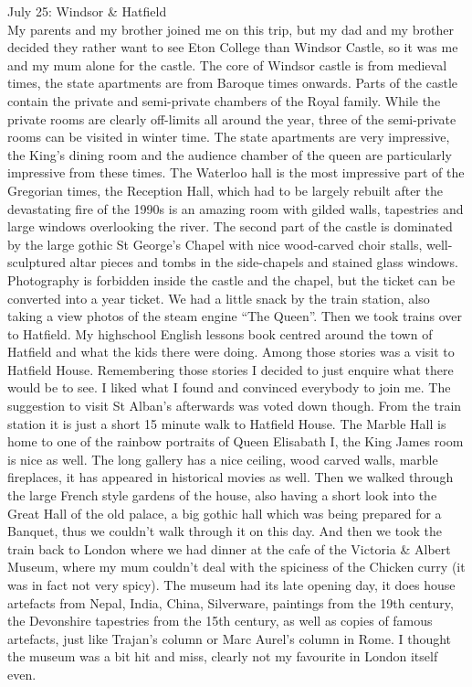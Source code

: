 July 25: Windsor \& Hatfield\\
My parents and my brother joined me on this trip, but my dad and my brother decided they rather want to see Eton College than Windsor Castle, so it was me and my mum alone for the castle. The core of Windsor castle is from medieval times, the state apartments are from Baroque times onwards. Parts of the castle contain the private and semi-private chambers of the Royal family. While the private rooms are clearly off-limits all around the year, three of the semi-private rooms can be visited in winter time. The state apartments are very impressive, the King's dining room and the audience chamber of the queen are particularly impressive from these times. The Waterloo hall is the most impressive part of the Gregorian times, the Reception Hall, which had to be largely rebuilt after the devastating fire of the 1990s is an amazing room with gilded walls, tapestries and large windows overlooking the river. The second part of the castle is dominated by the large gothic St George's Chapel with nice wood-carved choir stalls, well-sculptured altar pieces and tombs in the side-chapels and stained glass windows. Photography is forbidden inside the castle and the chapel, but the ticket can be converted into a year ticket. We had a little snack by the train station, also taking a view photos of the steam engine ``The Queen''. Then we took trains over to Hatfield. My highschool English lessons book centred around the town of Hatfield and what the kids there were doing. Among those stories was a visit to Hatfield House. Remembering those stories I decided to just enquire what there would be to see. I liked what I found and convinced everybody to join me. The suggestion to visit St Alban's afterwards was voted down though. From the train station it is just a short 15 minute walk to Hatfield House. The Marble Hall is home to one of the rainbow portraits of Queen Elisabath I, the King James room is nice as well. The long gallery has a nice ceiling, wood carved walls, marble fireplaces, it has appeared in historical movies as well. Then we walked through the large French style gardens of the house, also having a short look into the Great Hall of the old palace, a big gothic hall which was being prepared for a Banquet, thus we couldn't walk through it on this day. And then we took the train back to London where we had dinner at the cafe of the Victoria \& Albert Museum, where my mum couldn't deal with the spiciness of the Chicken curry (it was in fact not very spicy). The museum had its late opening day, it does house artefacts from Nepal, India, China, Silverware, paintings from the 19th century, the Devonshire tapestries from the 15th century, as well as copies of famous artefacts, just like Trajan's column or Marc Aurel's column in Rome. I thought the museum was a bit hit and miss, clearly not my favourite in London itself even.\\
  
